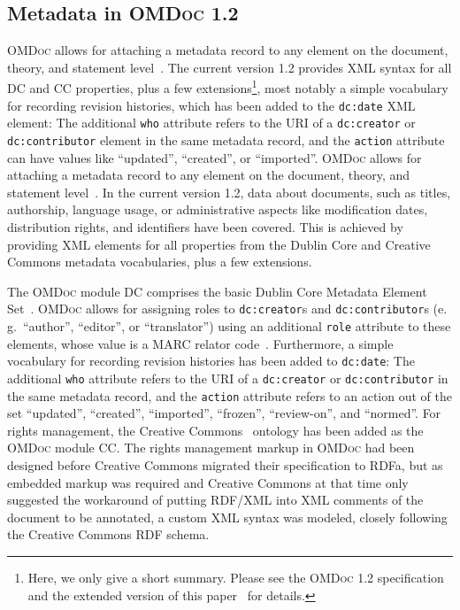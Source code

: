 \documentclass{llncs}
\renewcommand{\omdoc}{\textsc{OMDoc}\xspace}
\begin{document}
\subsection{Metadata in \omdoc 1.2}\label{sec:metadata-omdoc-1.2}

\ifpublic%
\omdoc allows for attaching a metadata record to any element on the document, theory, and
statement level~\cite[chapter 12]{Kohlhase:omdoc1.2}.  The current version 1.2 provides
XML syntax for all DC and CC properties, plus a few extensions\footnote{Here, we only give
  a short summary.  Please see the \omdoc 1.2 specification~\cite{Kohlhase:omdoc1.2} and
  the extended version of this paper~\cite{LK:OMDocOntologyLanguage08} for details.}, most
notably a simple vocabulary for recording revision histories, which has been added to the
\texttt{dc:date} XML element: The additional \texttt{who} attribute refers to the URI of a
\texttt{dc:creator} or \texttt{dc:contributor} element in the same metadata record, and
the \texttt{action} attribute can have values like ``updated'', ``created'', or
``imported''.%
\else%
\omdoc allows for attaching a metadata record to any element on the document, theory, and
statement level~\cite[chapter 12]{Kohlhase:omdoc1.2}.  In the current version 1.2, data
about documents, such as titles, authorship, language usage, or administrative aspects
like modification dates, distribution rights, and identifiers have been covered.  This is
achieved by providing XML elements for all properties from the Dublin Core and Creative
Commons metadata vocabularies, plus a few extensions.

The \omdoc module DC comprises the basic Dublin Core Metadata Element
Set~\cite{DCMI:dcmes08}.  \omdoc allows for assigning roles to
\texttt{dc:creator}s and \texttt{dc:contributor}s (e.\,g.\ ``author'',
``editor'', or ``translator'') using an additional \texttt{role} attribute to
these elements, whose value is a MARC relator code~\cite{Marc:relators03}.
Furthermore, a simple vocabulary for recording revision histories has been added
to \texttt{dc:date}: The additional \texttt{who} attribute refers to the URI of
a \texttt{dc:creator} or \texttt{dc:contributor} in the same metadata record,
and the \texttt{action} attribute refers to an action out of the set
``updated'', ``created'', ``imported'', ``frozen'', ``review-on'', and
``normed''.  For rights management, the Creative Commons~\cite{AALY08:ccREL}
ontology has been added as the \omdoc module CC.  The rights management markup
in \omdoc had been designed before Creative Commons migrated their specification
to RDFa, but as embedded markup was required and Creative Commons at that time
only suggested the workaround of putting RDF/XML into XML comments of the
document to be annotated, a custom XML syntax was modeled, closely following the
Creative Commons RDF schema.%
\fi
\end{document}
